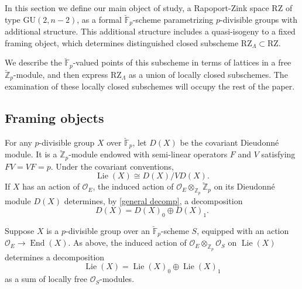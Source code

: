 \documentclass[11pt]{alggeom}
\newcommand{\iso}{\cong}
\newcommand{\Z}{\mathbb Z}
\newcommand{\F}{\mathbb F}
\newcommand{\co}{\mathcal O}
\DeclareMathOperator{\End}{End}
\DeclareMathOperator{\Lie}{Lie}
\begin{document}



In this section we define our main object of study, a  Rapoport-Zink space $\mathrm{RZ}$ of type $\mathrm{GU}(2,n-2)$, as a formal $\breve{\F}_p$-scheme  parametrizing $p$-divisible groups with additional structure.
This additional structure includes a quasi-isogeny to a fixed framing object, which determines distinguished closed subscheme $\mathrm{RZ}_\Lambda \subset \mathrm{RZ}$.  


We describe the $\breve{\F}_p$-valued points of this subscheme in terms of lattices in a free $\breve{\Z}_p$-module, and then
express $\mathrm{RZ}_\Lambda$ as a union of locally closed subschemes.  
The   examination of these locally closed subschemes will occupy the rest of the paper.




 
 \subsection{Framing objects}
 \label{ss:frame}
 













For any $p$-divisible group $X$ over $\breve{\F}_p$, let $D(X)$ be the covariant Dieudonn\'e module.
It is a $\breve{\Z}_p$-module endowed with semi-linear operators  $F$ and $V$ satisfying $FV=VF=p$.  Under the covariant conventions, 
\begin{equation}\label{dieudonne-lie}
\Lie(X) \iso D(X) / V  D(X).
\end{equation}
 If $X$ has an action of $\co_E$, the induced action of $\co_E\otimes_{\Z_p} \breve{\Z}_p$ on its Dieudonn\'e module $D(X)$ determines, by \eqref{general decomp}, a decomposition 
\[
D(X) = D(X)_0 \oplus D(X)_1.
\]


Suppose  $X$ is a $p$-divisible group over an $\breve{\F}_p$-scheme $S$, equipped with an  action $\co_E \to \End(X)$.
As above, the induced action of $\co_E\otimes_{\Z_p} \co_S$ on  $\Lie(X)$ determines  a decomposition 
\begin{equation}\label{lie decomp}
\Lie(X) = \Lie(X)_0 \oplus \Lie(X)_1
\end{equation}
as a sum of locally free $\co_S$-modules. 
\end{document}
